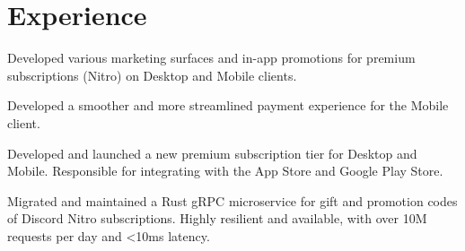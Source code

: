 \documentclass[letterpaper]{deedy-resume-openfont} %
\begin{document}

\lastupdated %


\section{Experience}
\sectionheadersep


\begin{tightemize}
\item 
\end{tightemize}

\sectionsep %


\begin{tightemize}
\item Developed various marketing surfaces and in-app promotions for premium subscriptions (Nitro) on Desktop and Mobile clients.
\item Developed a smoother and more streamlined payment experience for the Mobile client.
\item Developed and launched a new premium subscription tier for Desktop and Mobile. Responsible for integrating with the App Store and Google Play Store. 
\item Migrated and maintained a Rust gRPC microservice for gift and promotion codes of Discord Nitro subscriptions. Highly resilient and available, with over 10M requests per day and <10ms latency.
\end{tightemize}

\sectionsep %

\end{document}

